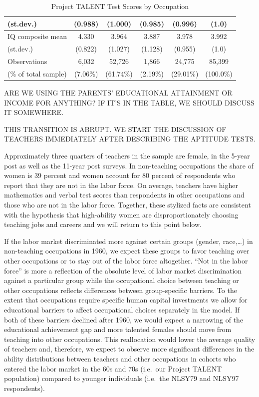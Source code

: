\documentclass[onehalfspacing,11pt]{article}
\begin{document}
\begin{table}[h!]
\begin{tabular}{lccccc}
			\quad (st.dev.) & (0.988) & (1.000) & (0.985) & (0.996) & (1.0)\\
			\midrule
			IQ composite mean & 4.330 & 3.964 & 3.887 & 3.978 & 3.992\\
			\quad (st.dev.) & (0.822) & (1.027) & (1.128) & (0.955) & (1.0)\\
			\midrule
			Observations & 6,032 & 52,726 & 1,866 & 24,775 & 85,399\\
			\quad (\% of total sample) & (7.06\%) & (61.74\%) & (2.19\%) & (29.01\%) &(100.0\%)\\
			\bottomrule
		\end{tabular}
		\caption{Project TALENT Test Scores by Occupation}
		\label{tab:PTscores}
	\end{table}
	
ARE WE USING THE PARENTS' EDUCATIONAL ATTAINMENT OR INCOME FOR ANYTHING? IF IT'S IN THE TABLE, WE SHOULD DISCUSS IT SOMEWHERE.

THIS TRANSITION IS ABRUPT. WE START THE DISCUSSION OF TEACHERS IMMEDIATELY AFTER DESCRIBING THE APTITUDE TESTS.

Approximately three quarters of teachers in the sample are female, in the 5-year post as well as the 11-year post surveys. In non-teaching occupations the share of women is 39 percent and women account for 80 percent of respondents who report that they are not in the labor force. On average, teachers have higher mathematics and verbal test scores than respondents in other occupations and those who are not in the labor force. Together, these stylized facts are consistent with the hypothesis that high-ability women are disproportionately choosing teaching jobs and careers and we will return to this point below.
	
If the labor market discriminated more against certain groups (gender, race,\ldots) in non-teaching occupations in 1960, we expect these groups to favor teaching over other occupations or to stay out of the labor force altogether. ``Not in the labor force'' is more a reflection of the absolute level of labor market discrimination against a particular group while the occupational choice between teaching or other occupations reflects differences between group-specific barriers. To the extent that occupations require specific human capital investments we allow for educational barriers to affect occupational choices separately in the model. If both of these barriers declined after 1960, we would expect a narrowing of the educational achievement gap and more talented females should move from teaching into other occupations. This reallocation would lower the average quality of teachers and, therefore, we expect to observe more significant differences in the ability distributions between teachers and other occupations in cohorts who entered the labor market in the 60s and 70s (i.e.~our Project TALENT population) compared to younger individuals (i.e.~the NLSY79 and NLSY97 respondents).
\end{document}
